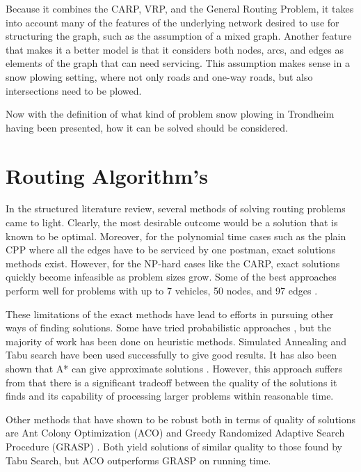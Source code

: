Because it combines the CARP, VRP, and the General Routing Problem, it takes into account many of the features of the underlying network desired to use for structuring the graph, such as the assumption of a mixed graph. Another feature that makes it a better model is that it considers both nodes, arcs, and edges as elements of the graph that can need servicing. This assumption makes sense in a snow plowing setting, where not only roads and one-way roads, but also intersections need to be plowed.

Now with the definition of what kind of problem snow plowing in Trondheim having been presented, how it can be solved should be considered.




\section{Routing Algorithm's} %
\label{sec:routing_algorithms}

In the structured literature review, several methods of solving routing problems came to light. Clearly, the most desirable outcome would be a solution that is known to be optimal. Moreover, for the polynomial time cases such as the plain CPP where all the edges have to be serviced by one postman, exact solutions methods exist. However, for the NP-hard cases like the CARP, exact solutions quickly become infeasible as problem sizes grow. Some of the best approaches perform well for problems with up to 7 vehicles, 50 nodes, and 97 edges \citep{belenguer2003cutting}.

These limitations of the exact methods have lead to efforts in pursuing other ways of finding solutions. Some have tried probabilistic approaches \citep{christiansen2009branch}, but the majority of work has been done on heuristic methods. Simulated Annealing \citep{eglese1994simulatedAnnealing} and Tabu search \citep{brandao2008tabu} have been used successfully to give good results. It has also been shown that A* can give approximate solutions \citep{rao2011AStar}. However, this approach suffers from that there is a significant tradeoff between the quality of the solutions it finds and its capability of processing larger problems within reasonable time.

Other methods that have shown to be robust both in terms of quality of solutions are Ant Colony Optimization (ACO) \citep{santos2010ACO} and Greedy Randomized Adaptive Search Procedure (GRASP) \citep{usberti2013grasp}. Both yield solutions of similar quality to those found by Tabu Search, but ACO outperforms GRASP on running time.

